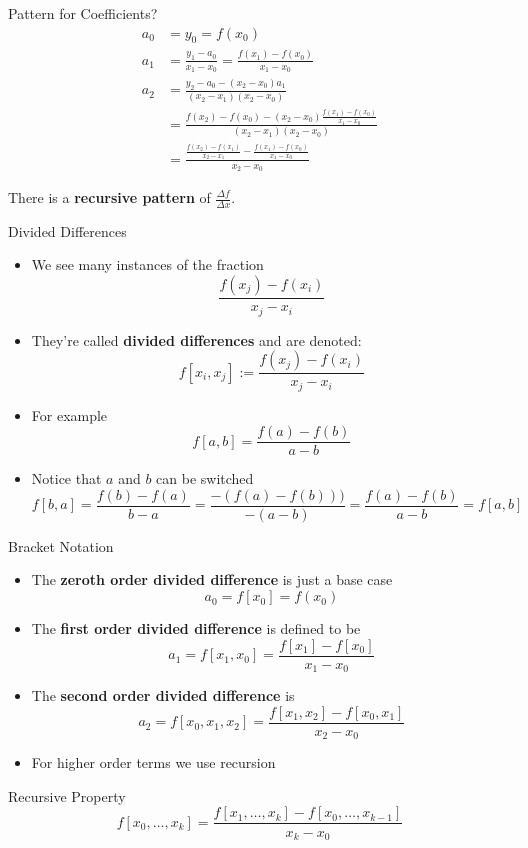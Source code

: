 \documentclass[10pt]{beamer}
\begin{document}
\begin{frame}{Pattern for Coefficients?}
\begin{align*}
  a_0 & = y_0 = f(x_0)\\
  a_1 & = \frac{y_1 - a_0}{x_1 - x_0} = \frac{f(x_1)-f(x_0)}{x_1 - x_0}\\
  a_2 & = \frac{y_2 - a_0 - (x_2-x_0)a_1}{(x_2-x_1)(x_2-x_0)}\\
      & = \frac{f(x_2)-f(x_0)-(x_2-x_0)\frac{f(x_1)-f(x_0)}{x_1-x_0}}{(x_2-x_1)(x_2-x_0)}\\
      & = \frac{\frac{f(x_2)-f(x_1)}{x_2-x_1} - \frac{f(x_1)-f(x_0)}{x_1-x_0} }{x_2-x_0}
\end{align*}
\begin{center}
    There is a \textbf{recursive pattern} of $\frac{\Delta f}{\Delta x}$.
\end{center}
\end{frame}
\begin{frame}{Divided Differences}
\begin{itemize}
    \item  We see many instances of the fraction
\begin{equation*}
  \frac{f(x_j)-f(x_i)}{x_j-x_i}
\end{equation*}
\item They're called \textbf{divided differences} and are denoted:
\begin{equation*}
  f[x_i,x_j] := \frac{f(x_j)-f(x_i)}{x_j-x_i}
\end{equation*}

\item For example 
    $$  f[a,b] = \frac{f(a) - f(b)}{a - b}$$

\item Notice that $a$ and $b$ can be switched 
$$ f[b,a] = \frac{f(b)-f(a)}{b-a} = \frac{-(f(a) - f(b)))}{-(a-b)} = \frac{f(a) - f(b)}{a - b} = f[a,b]$$
\end{itemize}
\end{frame}
\begin{frame}{Bracket Notation}
\begin{itemize}
    \item The \textbf{zeroth order divided difference} is just a base case 
      $$a_0= f[x_0] = f(x_0)$$ 
    \item The \textbf{first order divided difference} is defined to be
     $$ a_1 = f[x_1,x_0] = \frac{f[x_1]-f[x_0]}{x_1-x_0} $$
    \item The \textbf{second order divided difference} is 
     $$ a_2 = f[x_0,x_1,x_2] = \frac{f[x_1,x_2]-f[x_0,x_1]}{x_2-x_0} $$
    \item For higher order terms we use recursion
\end{itemize}
\begin{block}{Recursive Property}
$$ f[x_0,\dots,x_k] = \frac{f[x_1,\dots,x_k]-f[x_0,\dots,x_{k-1}]}{x_k - x_0}$$
\end{block}
\end{frame}
\end{document}
